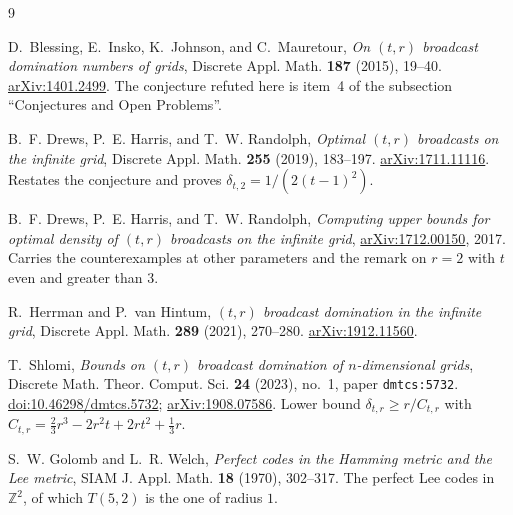 \documentclass[11pt]{amsart}
\theoremstyle{remark}
\newcommand{\ZZ}{\mathbb{Z}}
\newcommand{\dens}{\delta}
\newcommand{\Tstd}{T}
\begin{document}
\begin{thebibliography}{9}

D.~Blessing, E.~Insko, K.~Johnson, and C.~Mauretour,
\emph{On $(t,r)$ broadcast domination numbers of grids},
Discrete Appl. Math. \textbf{187} (2015), 19--40.
\href{https://arxiv.org/abs/1401.2499}{arXiv:1401.2499}.
The conjecture refuted here is item~4 of the subsection ``Conjectures and Open
Problems''.

B.~F. Drews, P.~E. Harris, and T.~W. Randolph,
\emph{Optimal $(t,r)$ broadcasts on the infinite grid},
Discrete Appl. Math. \textbf{255} (2019), 183--197.
\href{https://arxiv.org/abs/1711.11116}{arXiv:1711.11116}.
Restates the conjecture and proves $\dens_{t,2}=1/(2(t-1)^2)$.

B.~F. Drews, P.~E. Harris, and T.~W. Randolph,
\emph{Computing upper bounds for optimal density of $(t,r)$ broadcasts on the
infinite grid},
\href{https://arxiv.org/abs/1712.00150}{arXiv:1712.00150}, 2017.
Carries the counterexamples at other parameters and the remark on $r=2$ with $t$
even and greater than $3$.

R.~Herrman and P.~van Hintum,
\emph{$(t,r)$ broadcast domination in the infinite grid},
Discrete Appl. Math. \textbf{289} (2021), 270--280.
\href{https://arxiv.org/abs/1912.11560}{arXiv:1912.11560}.

T.~Shlomi,
\emph{Bounds on $(t,r)$ broadcast domination of $n$-dimensional grids},
Discrete Math. Theor. Comput. Sci. \textbf{24} (2023), no.~1, paper
\texttt{dmtcs:5732}.
\href{https://doi.org/10.46298/dmtcs.5732}{doi:10.46298/dmtcs.5732};
\href{https://arxiv.org/abs/1908.07586}{arXiv:1908.07586}.
Lower bound $\dens_{t,r}\ge r/C_{t,r}$ with
$C_{t,r}=\tfrac23r^3-2r^2t+2rt^2+\tfrac13r$.

S.~W. Golomb and L.~R. Welch,
\emph{Perfect codes in the Hamming metric and the Lee metric},
SIAM J. Appl. Math. \textbf{18} (1970), 302--317.
The perfect Lee codes in $\ZZ^2$, of which $\Tstd(5,2)$ is the one of radius $1$.

\end{thebibliography}
\end{document}
